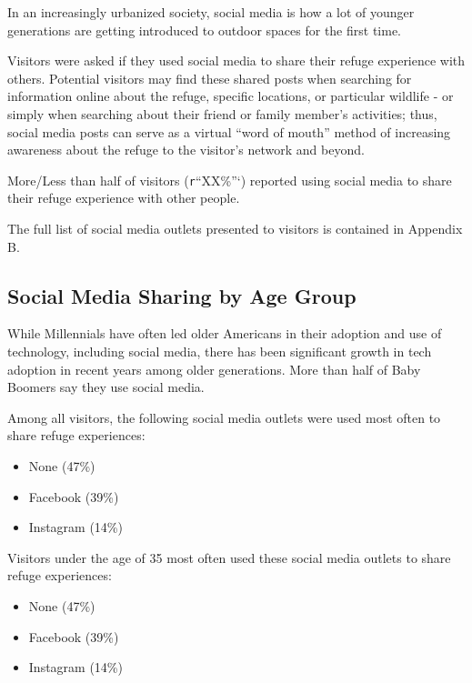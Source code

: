 \documentclass[]{book}
\providecommand{\tightlist}{%
  \setlength{\itemsep}{0pt}\setlength{\parskip}{0pt}}
\begin{document}
In an increasingly urbanized society, social media is how a lot of
younger generations are getting introduced to outdoor spaces for the
first time.

Visitors were asked if they used social media to share their refuge
experience with others. Potential visitors may find these shared posts
when searching for information online about the refuge, specific
locations, or particular wildlife - or simply when searching about their
friend or family member's activities; thus, social media posts can serve
as a virtual ``word of mouth'' method of increasing awareness about the
refuge to the visitor's network and beyond.

More/Less than half of visitors (\texttt{r}``XX\%''`) reported using
social media to share their refuge experience with other people.

The full list of social media outlets presented to visitors is contained
in Appendix B.

\subsection{Social Media Sharing by Age
Group}\label{social-media-sharing-by-age-group}

While Millennials have often led older Americans in their adoption and
use of technology, including social media, there has been significant
growth in tech adoption in recent years among older generations. More
than half of Baby Boomers say they use social media.

Among all visitors, the following social media outlets were used most
often to share refuge experiences:

\begin{itemize}
\tightlist
\item
  None (47\%)
\item
  Facebook (39\%)
\item
  Instagram (14\%)
\end{itemize}

Visitors under the age of 35 most often used these social media outlets
to share refuge experiences:

\begin{itemize}
\tightlist
\item
  None (47\%)
\item
  Facebook (39\%)
\item
  Instagram (14\%)
\end{itemize}
\end{document}
